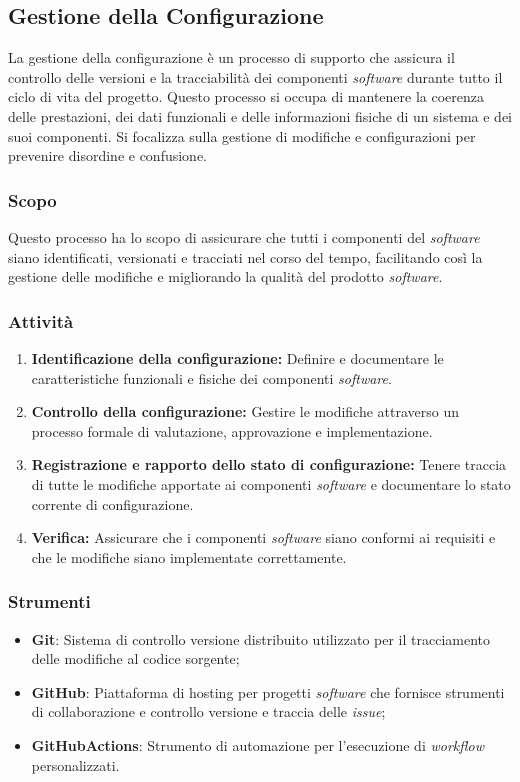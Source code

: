 \subsection{Gestione della Configurazione}

La gestione della configurazione è un processo di supporto che assicura il
controllo delle versioni e la tracciabilità dei componenti \textit{software}
durante tutto il ciclo di vita del progetto.
Questo processo si occupa di mantenere la coerenza delle prestazioni, dei dati
funzionali e delle informazioni fisiche di un sistema e dei suoi componenti.
Si focalizza sulla gestione di modifiche e configurazioni per prevenire
disordine e confusione.

\subsubsection{Scopo}
Questo processo ha lo scopo di assicurare che tutti i componenti del
\textit{software} siano identificati, versionati e tracciati nel corso del
tempo, facilitando così la gestione delle modifiche e migliorando la qualità
del prodotto \textit{software}.

\subsubsection{Attività}
\begin{enumerate}
	\item \textbf{Identificazione della configurazione:} Definire e documentare
	      le caratteristiche funzionali e fisiche dei componenti
	      \textit{software}.
	\item \textbf{Controllo della configurazione:} Gestire le modifiche
	      attraverso un processo formale di valutazione, approvazione e
	      implementazione.
	\item \textbf{Registrazione e rapporto dello stato di configurazione:}
	      Tenere traccia di tutte le modifiche apportate ai componenti
	      \textit{software} e documentare lo stato corrente di configurazione.
	\item \textbf{Verifica:} Assicurare che i componenti \textit{software} siano
	      conformi ai requisiti e che le modifiche siano implementate
	      correttamente.
\end{enumerate}

\subsubsection{Strumenti}
\begin{itemize}
	\item \textbf{Git}: Sistema di controllo versione distribuito utilizzato per
	      il tracciamento delle modifiche al codice sorgente;
	\item \textbf{GitHub\g}: Piattaforma di hosting per progetti \textit{software}
	      che fornisce strumenti di collaborazione e controllo versione e
	      traccia delle \textit{issue\g};
	\item \textbf{GitHub\g Actions}: Strumento di automazione per l'esecuzione di
	      \textit{workflow} personalizzati.
\end{itemize}
